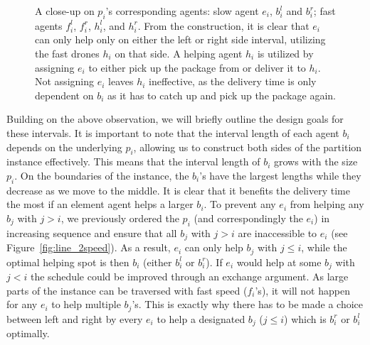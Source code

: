 \begin{figure}[ht]
    \centering
    
    \caption{A close-up on $p_i$'s corresponding agents: slow agent $e_i$, $b_i^l $ and $ b_i^r$;  fast agents $f_i^l $, $ f_i^r$, $h_i^l$, and $ h_i^r$. From the construction, it is clear that  $e_i$ can only help only on either the left or right side interval, utilizing the fast drones $h_i$ on that side. A helping agent $h_i$ is utilized by assigning $e_i$ to either pick up the package from or deliver it to $h_i$. Not assigning $e_i$ leaves $h_i$ ineffective, as the delivery time is only dependent on $b_i$ as it has to catch up and pick up the package again.}
\label{fig:line_2speed_gadget}
\end{figure}


Building on the above observation, we will briefly outline the design goals for these intervals. 
It is important to note that the interval length of each agent $b_i$ depends on the underlying $p_i$, allowing us to construct both sides of the partition instance effectively. This means that the interval length of $b_i$ grows with the size $p_i$.  On the boundaries of the instance, the $b_i$'s have the largest lengths while they decrease as we move to the middle. It is clear that it benefits the delivery time the most if an element agent helps a larger $b_i$. To prevent any $e_i$ from helping any $b_j$ with $j>i$, we previously ordered the $p_i$ (and correspondingly the $e_i$) in increasing sequence and ensure that all $b_j$ with $j>i$ are inaccessible to $e_i$ (see Figure~\ref{fig:line_2speed}). As a result, $e_i$ can only help $b_j$ with $j\leq i$, while the optimal helping spot is then $b_i$ (either $b^l_i$ or  $b^r_i$). If $e_i$ would help at some $b_j$ with $j<i$ the schedule could be improved through an exchange argument. As large parts of the instance can be traversed with fast speed ($f_i$'s), it will not happen for any $e_i$ to help multiple $b_j$'s. This is exactly why there has to be made a choice between left and right by every $e_i$ to help a designated $b_j$ ($j\leq i$) which is $b_i^r$ or $b_i^l$ optimally.



